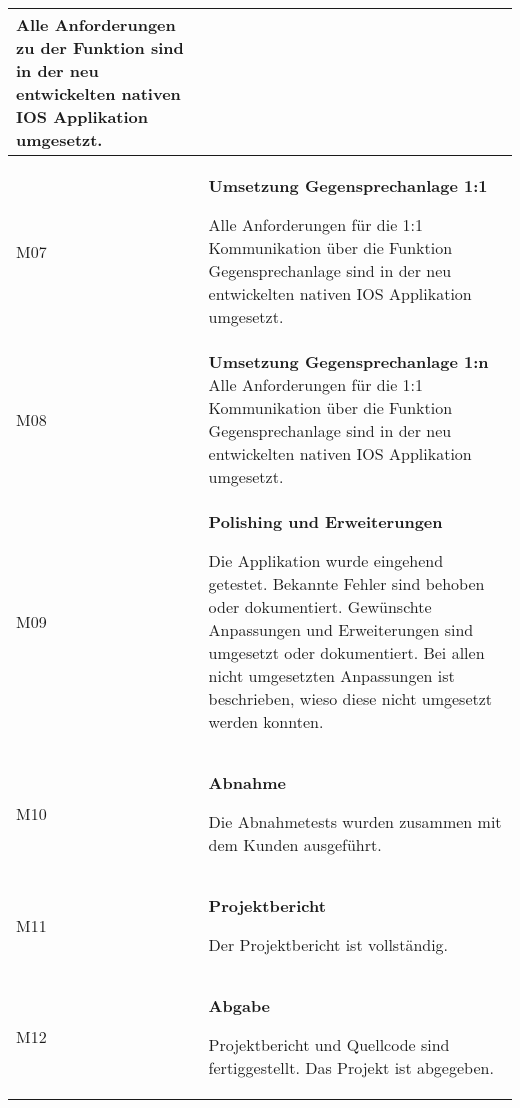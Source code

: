 \begin{table}[h]
\begin{tabular}{|l|p{15cm}|}
        Alle Anforderungen zu der  Funktion sind in der neu entwickelten nativen IOS Applikation umgesetzt. \\
        \hline

        M07         & \textbf{Umsetzung Gegensprechanlage 1:1}

        Alle Anforderungen für die 1:1 Kommunikation über die Funktion Gegensprechanlage sind in der neu entwickelten nativen IOS Applikation umgesetzt. \\
        \hline

        M08         & \textbf{Umsetzung Gegensprechanlage 1:n}
        Alle Anforderungen für die 1:1 Kommunikation über die Funktion Gegensprechanlage sind in der neu entwickelten nativen IOS Applikation umgesetzt. \\
        \hline

        M09         & \textbf{Polishing und Erweiterungen}

        Die Applikation wurde eingehend getestet.
        Bekannte Fehler sind behoben oder dokumentiert.
        Gewünschte Anpassungen und Erweiterungen sind umgesetzt oder dokumentiert.
        Bei allen nicht umgesetzten Anpassungen ist beschrieben, wieso diese nicht umgesetzt werden konnten.
        \\
        \hline

        M10         & \textbf{Abnahme}

        Die Abnahmetests wurden zusammen mit dem Kunden ausgeführt. \\
        \hline

        M11         & \textbf{Projektbericht}

        Der Projektbericht ist vollständig.\\
        \hline

        M12         & \textbf{Abgabe}

        Projektbericht und Quellcode sind fertiggestellt.
        Das Projekt ist abgegeben.\\
        \hline



    \end{tabular}\label{tab:milestones}
\end{table}

\clearpage
